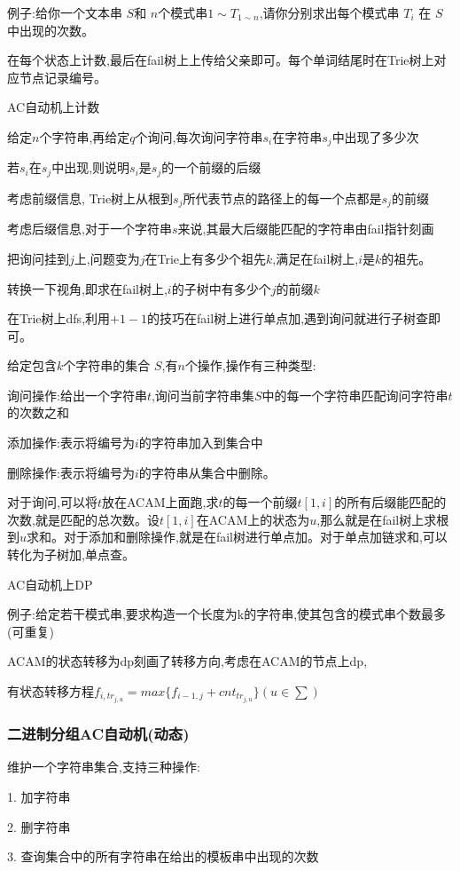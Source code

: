 \documentclass[a4paper, fontset=none]{ctexart}
\begin{document}
例子:给你一个文本串 $S$和 $n$个模式串$1∼T_{1∼n}$,请你分别求出每个模式串 $T_i$ 在 $S$中出现的次数。

在每个状态上计数,最后在fail树上上传给父亲即可。每个单词结尾时在Trie树上对应节点记录编号。

AC自动机上计数

给定$n$个字符串,再给定$q$个询问,每次询问字符串$s_i$在字符串$s_j$中出现了多少次

若$s_i$在$s_j$中出现,则说明$s_i$是$s_j$的一个前缀的后缀

考虑前缀信息, Trie树上从根到$s_j$所代表节点的路径上的每一个点都是$s_j$的前缀

考虑后缀信息,对于一个字符串$s$来说,其最大后缀能匹配的字符串由fail指针刻画

把询问挂到$j$上,问题变为$j$在Trie上有多少个祖先$k$,满足在fail树上,$i$是$k$的祖先。

转换一下视角,即求在fail树上,$i$的子树中有多少个$j$的前缀$k$

在Trie树上dfs,利用$+1 -1$的技巧在fail树上进行单点加,遇到询问就进行子树查即可。

给定包含$k$个字符串的集合 $S$,有$n$个操作,操作有三种类型:

询问操作:给出一个字符串$t$,询问当前字符串集$S$中的每一个字符串匹配询问字符串$t$的次数之和

添加操作:表示将编号为$i$的字符串加入到集合中

删除操作:表示将编号为$i$的字符串从集合中删除。

对于询问,可以将$t$放在ACAM上面跑,求$t$的每一个前缀$t[1, i]$的所有后缀能匹配的次数,就是匹配的总次数。设$t[1, i]$在ACAM上的状态为$u$,那么就是在fail树上求根到$u$求和。对于添加和删除操作,就是在fail树进行单点加。对于单点加链求和,可以转化为子树加,单点查。

AC自动机上DP

例子:给定若干模式串,要求构造一个长度为k的字符串,使其包含的模式串个数最多(可重复)

ACAM的状态转移为dp刻画了转移方向,考虑在ACAM的节点上dp,

有状态转移方程$f_{i, tr_{j, u}}=max\{f_{i-1, j}+cnt_{tr_{j, u}}\}(u\in \sum)$ 
\subsubsection{二进制分组AC自动机(动态)}

维护一个字符串集合,支持三种操作:

1. 加字符串

2. 删字符串

3. 查询集合中的所有字符串在给出的模板串中出现的次数
\end{document}

